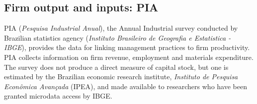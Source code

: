 

\subsection{Firm output and inputs: PIA}

PIA (\textit{Pesquisa Industrial Anual}), the Annual Industrial survey conducted by Brazilian statistics agency (\textit{Instituto Brasileiro de Geografia e Estatistica - IBGE}), provides the data for linking management practices to firm productivity. PIA collects information on firm revenue, employment and materials expenditure. The survey does not produce a direct measure of capital stock, but one is estimated by the Brazilian economic research institute, \textit{Instituto de Pesquisa Econ\^omica Avan\c{c}ada} (IPEA), and made available to researchers who have been granted microdata access by IBGE. 
